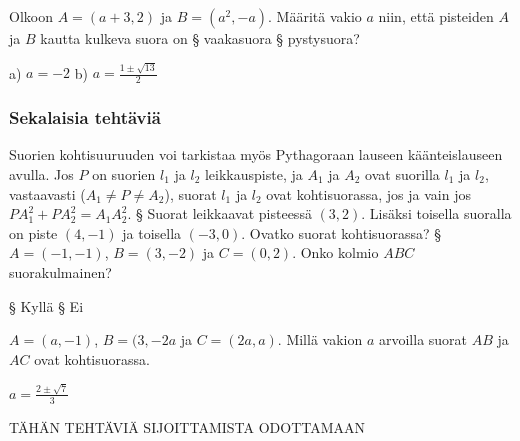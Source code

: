 \begin{tehtavasivu}
\begin {tehtava}
Olkoon $A=(a+3, 2)$ ja $B=(a^2, -a)$. Määritä vakio $a$ niin, että pisteiden $A$ ja $B$ kautta kulkeva suora on
\alakohdat
§ vaakasuora
§ pystysuora?
\loppu
\begin {vastaus}
a) $a=-2$ b) $a=\frac{1\pm\sqrt{13}}{2} $
\end {vastaus}
\end {tehtava}

\subsubsection*{Sekalaisia tehtäviä}

\begin{tehtava}
Suorien kohtisuuruuden voi tarkistaa myös Pythagoraan lauseen käänteislauseen avulla. Jos $P$ on suorien $l_1$ ja $l_2$ leikkauspiste, ja $A_1$ ja $A_2$ ovat suorilla $l_1$ ja $l_2$, vastaavasti ($A_1 \neq P \neq A_2$), suorat $l_1$ ja $l_2$ ovat kohtisuorassa, jos ja vain jos $PA_1^2+PA_2^2 = A_1A_2^2$.
\alakohdat
§ Suorat leikkaavat pisteessä $(3,2)$. Lisäksi toisella suoralla on piste $(4,-1)$ ja toisella $(-3,0)$. Ovatko suorat kohtisuorassa?
§ $A = (-1,-1)$, $B = (3,-2)$ ja $C = (0,2)$. Onko kolmio $ABC$ suorakulmainen?
\loppu
\begin{vastaus}
\alakohdat
§ Kyllä
§ Ei
\loppu
\end{vastaus}
\end{tehtava}

\begin{tehtava}
$A = (a,-1)$, $B = (3,-2a$ ja $C = (2a,a)$. Millä vakion $a$ arvoilla suorat $AB$ ja $AC$ ovat kohtisuorassa.
\begin{vastaus}
$a = \frac{2\pm \sqrt{7}}{3}$
\end{vastaus}
\end{tehtava}

TÄHÄN TEHTÄVIÄ SIJOITTAMISTA ODOTTAMAAN

\end{tehtavasivu}


